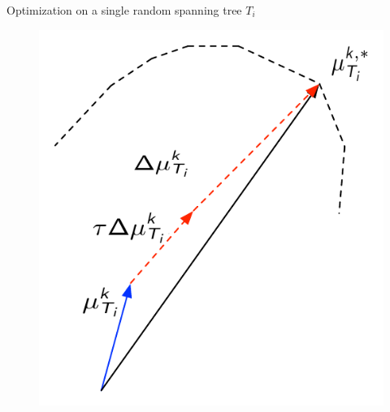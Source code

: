 \documentclass[first=dgreen,second=purple,logo=yellowexc]{aaltoslides}
\begin{document}
\begin{frame}{Optimization on a single random spanning tree $T_i$}
	\begin{figure}
		\begin{center}
			\includegraphics[scale=0.5]{optimization_single_tree.pdf}
		\end{center}
	\end{figure}
\end{frame}
\end{document}

